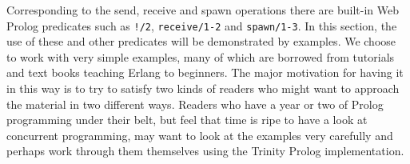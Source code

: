 


\noindent Corresponding to the send, receive and spawn operations there are built-in Web Prolog predicates such as \texttt{!/2}, \texttt{receive/1-2} and \texttt{spawn/1-3}. In this section, the use of these and other predicates will be demonstrated by examples. We choose to work with very simple examples, many of which are borrowed from tutorials and text books teaching Erlang to beginners. The major motivation for having it in this way is to try to satisfy two kinds of readers who might want to approach the material in two different ways. Readers who have a year or two of Prolog programming under their belt, but feel that time is ripe to have a look at concurrent programming, may want to look at the examples very carefully and perhaps work through them themselves using the Trinity Prolog implementation.

